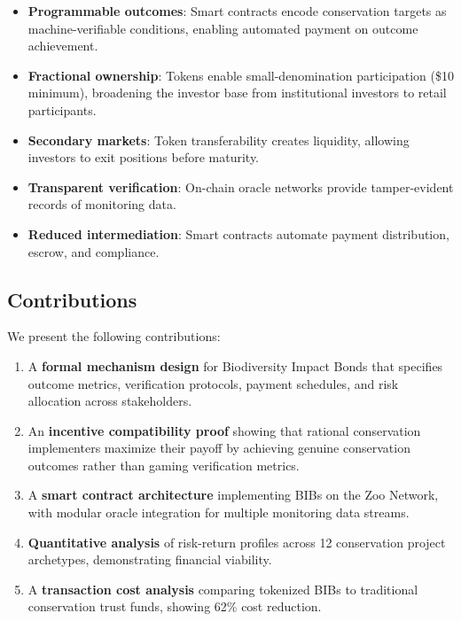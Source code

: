 \documentclass[11pt,a4paper]{article}
\begin{document}
\begin{itemize}
  \item \textbf{Programmable outcomes}: Smart contracts encode
    conservation targets as machine-verifiable conditions, enabling
    automated payment on outcome achievement.
  \item \textbf{Fractional ownership}: Tokens enable small-denomination
    participation (\$10 minimum), broadening the investor base from
    institutional investors to retail participants.
  \item \textbf{Secondary markets}: Token transferability creates
    liquidity, allowing investors to exit positions before maturity.
  \item \textbf{Transparent verification}: On-chain oracle networks
    provide tamper-evident records of monitoring data.
  \item \textbf{Reduced intermediation}: Smart contracts automate
    payment distribution, escrow, and compliance.
\end{itemize}

\subsection{Contributions}

We present the following contributions:

\begin{enumerate}
  \item A \textbf{formal mechanism design} for Biodiversity Impact Bonds
    that specifies outcome metrics, verification protocols, payment
    schedules, and risk allocation across stakeholders.

  \item An \textbf{incentive compatibility proof} showing that rational
    conservation implementers maximize their payoff by achieving genuine
    conservation outcomes rather than gaming verification metrics.

  \item A \textbf{smart contract architecture} implementing BIBs on the
    Zoo Network, with modular oracle integration for multiple
    monitoring data streams.

  \item \textbf{Quantitative analysis} of risk-return profiles across 12
    conservation project archetypes, demonstrating financial viability.

  \item A \textbf{transaction cost analysis} comparing tokenized BIBs to
    traditional conservation trust funds, showing 62\% cost reduction.
\end{enumerate}
\end{document}
